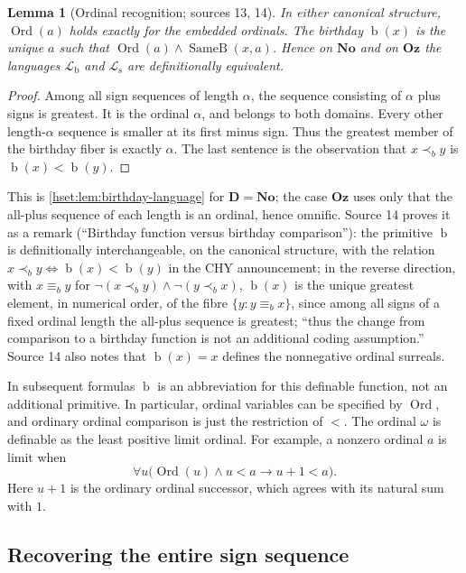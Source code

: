 \documentclass[11pt,letterpaper]{article}
\newtheorem{lemma}[lemma]{Lemma}\aliascntresetthe{lemma}
\theoremstyle{definition}
\theoremstyle{remark}
\newcommand{\No}{\mathbf{No}}
\newcommand{\Ord}{\operatorname{Ord}}
\newcommand{\bd}{\operatorname{b}}
\newcommand{\Oz}{\mathbf{Oz}}
\newcommand{\precb}{\prec_b}
\newcommand{\EqB}{\operatorname{SameB}}
\newcommand{\Dd}{\mathbf{D}}
\newcommand{\Lb}{\mathcal L_{\mathrm b}}
\newcommand{\Ls}{\mathcal L_{\mathrm s}}
\begin{document}
\begin{lemma}[Ordinal recognition; sources 13, 14]\label{hset:sf:lem:ord}
In either canonical structure, $\Ord(a)$ holds exactly for the embedded
ordinals. The birthday $\bd(x)$ is the unique $a$ such that
$\Ord(a)\land\EqB(x,a)$. Hence on $\No$ and on $\Oz$ the languages $\Lb$ and
$\Ls$ are definitionally equivalent.
\end{lemma}
\begin{proof}
Among all sign sequences of length $\alpha$, the sequence consisting of $\alpha$
plus signs is greatest. It is the ordinal $\alpha$, and belongs to both domains.
Every other length-$\alpha$ sequence is smaller at its first minus sign. Thus the
greatest member of the birthday fiber is exactly $\alpha$. The last sentence is
the observation that $x\precb y$ is $\bd(x)<\bd(y)$.
\end{proof}

This is \cref{hset:lem:birthday-language} for $\Dd=\No$; the case $\Oz$ uses only
that the all-plus sequence of each length is an ordinal, hence omnific. Source 14
proves it as a remark (``Birthday function versus birthday comparison''): the
primitive $\bd$ is definitionally interchangeable, on the canonical structure,
with the relation $x\precb y\iff\bd(x)<\bd(y)$ in the CHY announcement; in the
reverse direction, with $x\equiv_b y$ for $\neg(x\precb y)\land\neg(y\precb x)$,
$\bd(x)$ is the unique greatest element, in numerical order, of the fibre
$\{y:y\equiv_b x\}$, since among all signs of a fixed ordinal length the all-plus
sequence is greatest; ``thus the change from comparison to a birthday function is
not an additional coding assumption.'' Source 14 also notes that $\bd(x)=x$
defines the nonnegative ordinal surreals.

In subsequent formulas $\bd$ is an abbreviation for this definable function, not
an additional primitive. In particular, ordinal variables can be specified by
$\Ord$, and ordinary ordinal comparison is just the restriction of $<$. The
ordinal $\omega$ is definable as the least positive limit ordinal. For example, a
nonzero ordinal $a$ is limit when
\[
 \forall u\bigl(\Ord(u)\land u<a\longrightarrow u+1<a\bigr).
\]
Here $u+1$ is the ordinary ordinal successor, which agrees with its natural sum
with $1$.

\subsection{Recovering the entire sign sequence}
\end{document}
